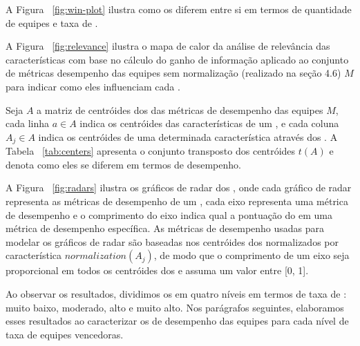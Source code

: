 A Figura ~\ref{fig:win-plot} ilustra como os  diferem entre si em termos de quantidade de equipes e taxa de .

A Figura ~\ref{fig:relevance} ilustra o mapa de calor da análise de relevância das características com base no cálculo do ganho de informação aplicado ao conjunto de métricas desempenho das equipes sem normalização (realizado na seção 4.6) $M$ para indicar como eles influenciam cada .

Seja $A$ a matriz de centróides dos  das métricas de desempenho das equipes $M$, cada linha $a \in A$ indica os centróides das características de um , e cada coluna $A_j \in A$ indica os centróides de uma determinada característica através dos . A Tabela ~\ref{tab:centers} apresenta o conjunto transposto dos centróides $t(A)$ e denota como eles se diferem em termos de desempenho.

A Figura ~\ref{fig:radars} ilustra os gráficos de radar dos , onde cada gráfico de radar representa as métricas de desempenho de um , cada eixo representa uma métrica de desempenho e o comprimento do eixo indica qual a pontuação do  em uma métrica de desempenho específica. As métricas de desempenho usadas para modelar os gráficos de radar são baseadas nos centróides dos  normalizados por característica $normalization(A_j)$, de modo que o comprimento de um eixo seja proporcional em todos os centróides dos  e assuma um valor entre [0, 1].

Ao observar os resultados, dividimos os  em quatro níveis em termos de taxa de : muito baixo, moderado, alto e muito alto. Nos parágrafos seguintes, elaboramos esses resultados ao caracterizar os  de desempenho das equipes para cada nível de taxa de equipes vencedoras.

